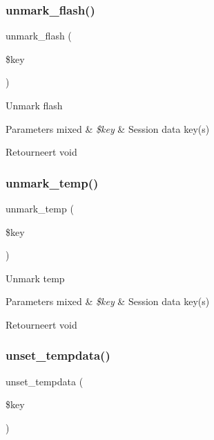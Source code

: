 \subsubsection{\texorpdfstring{unmark\_flash()}{unmark\_flash()}}
{\footnotesize\ttfamily unmark\+\_\+flash (\begin{DoxyParamCaption}\item[{}]{\$key }\end{DoxyParamCaption})}

Unmark flash


\begin{DoxyParams}[1]{Parameters}
mixed & {\em \$key} & Session data key(s) \\
\hline
\end{DoxyParams}
\begin{DoxyReturn}{Retourneert}
void 
\end{DoxyReturn}
\mbox{\label{class_c_i___session_a602eaf2b4a6936ed9bb8750892fac551}} 
\subsubsection{\texorpdfstring{unmark\_temp()}{unmark\_temp()}}
{\footnotesize\ttfamily unmark\+\_\+temp (\begin{DoxyParamCaption}\item[{}]{\$key }\end{DoxyParamCaption})}

Unmark temp


\begin{DoxyParams}[1]{Parameters}
mixed & {\em \$key} & Session data key(s) \\
\hline
\end{DoxyParams}
\begin{DoxyReturn}{Retourneert}
void 
\end{DoxyReturn}
\mbox{\label{class_c_i___session_a79d3115c19f6dfa873ca5f3a7929f24a}} 
\subsubsection{\texorpdfstring{unset\_tempdata()}{unset\_tempdata()}}
{\footnotesize\ttfamily unset\+\_\+tempdata (\begin{DoxyParamCaption}\item[{}]{\$key }\end{DoxyParamCaption})}

